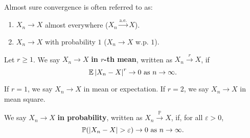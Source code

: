 \documentclass{huhtakm-template-book-v2}
\newcommand{\prob}{\mathbb{P}}
\newcommand{\expect}{\mathbb{E}}
\begin{document}
    \begin{rem}
        Almost sure convergence is often referred to as:
        \begin{enumerate}
            \item $X_{n} \to X$ almost everywhere ($X_{n}\xrightarrow{\text{a.e.}}X$).
            \item $X_{n} \to X$ with probability $1$ ($X_{n} \to X$ w.p. $1$).
        \end{enumerate}
    \end{rem}
    \begin{defn}
        Let $r \geq 1$. We say $X_{n} \to X$ \textbf{in $r$-th mean}, written as $X_{n} \xrightarrow{r} X$, if
        \begin{equation*}
            \expect\abs{X_{n}-X}^{r} \to 0 \text{ as } n \to \infty.
        \end{equation*}
    \end{defn}
    \begin{eg}
        If $r = 1$, we say $X_{n} \to X$ in mean or expectation. If $r = 2$, we say $X_{n} \to X$ in mean square.
    \end{eg}
    \begin{defn}
        We say $X_{n} \to X$ \textbf{in probability}, written as $X_{n} \xrightarrow{\prob} X$, if, for all $\varepsilon > 0$,
        \begin{equation*}
            \prob(\abs{X_{n}-X} > \varepsilon) \to 0 \text{ as } n \to \infty.
        \end{equation*}
    \end{defn}
    \newpage
\end{document}
